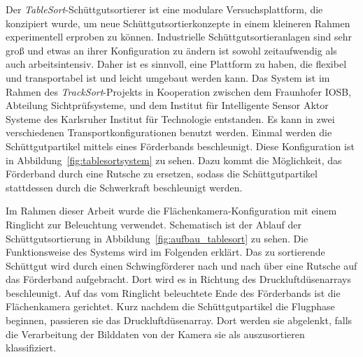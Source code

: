 

Der \textit{TableSort}-Schüttgutsortierer ist eine modulare Versuchsplattform, die konzipiert wurde, um neue Schüttgutsortierkonzepte in einem kleineren Rahmen experimentell erproben zu können.
Industrielle Schüttgutsortieranlagen sind sehr groß und etwas an ihrer Konfiguration zu ändern ist sowohl zeitaufwendig als auch arbeitsintensiv.
Daher ist es sinnvoll, eine Plattform zu haben, die flexibel und transportabel ist und leicht umgebaut werden kann.
Das System ist im Rahmen des \textit{TrackSort}-Projekts in Kooperation zwischen dem Fraunhofer IOSB, Abteilung Sichtprüfsysteme, und dem Institut für Intelligente Sensor Aktor Systeme des Karlsruher Institut für Technologie entstanden\cite{doll2015}.
Es kann in zwei verschiedenen Transportkonfigurationen benutzt werden.
Einmal werden die Schüttgutpartikel mittels eines Förderbands beschleunigt.
Diese Konfiguration ist in Abbildung~\ref{fig:tablesortsystem} zu sehen.
Dazu kommt die Möglichkeit, das Förderband durch eine Rutsche zu ersetzen, sodass die Schüttgutpartikel stattdessen durch die Schwerkraft beschleunigt werden. 

Im Rahmen dieser Arbeit wurde die Flächenkamera-Konfiguration mit einem Ringlicht zur Beleuchtung verwendet.
Schematisch ist der Ablauf der Schüttgutsortierung in Abbildung~\ref{fig:aufbau_tablesort} zu sehen.
Die Funktionsweise des Systems wird im Folgenden erklärt.
Das zu sortierende Schüttgut wird durch einen Schwingförderer nach und nach über eine Rutsche auf das Förderband aufgebracht.
Dort wird es in Richtung des Druckluftdüsenarrays beschleunigt. 
Auf das vom Ringlicht beleuchtete Ende des Förderbands ist die Flächenkamera gerichtet.
Kurz nachdem die Schüttgutpartikel die Flugphase beginnen, passieren sie das Druckluftdüsenarray.
Dort werden sie abgelenkt, falls die Verarbeitung der Bilddaten von der Kamera sie als auszusortieren klassifiziert.

